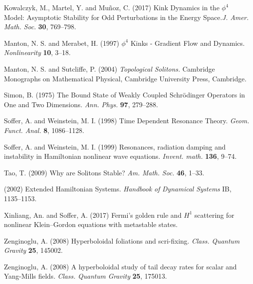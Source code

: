 \begin{thebibliography}{}

 Kowalczyk, M., Martel, Y. and Mu\~noz, C. (2017)
Kink Dynamics in the $\phi^4$ Model: Asymptotic Stability for Odd Perturbations in the Energy Space.\textit{J. Amer. Math. Soc.} {\bf 30}, 769--798.

 Manton, N. S. and Merabet, H. (1997)
$\phi^4$ Kinks - Gradient Flow and Dynamics. \textit{Nonlinearity} {\bf 10}, 3--18.

 Manton, N. S. and Sutcliffe, P. (2004)
\textit{Topological Solitons.} Cambridge Monographs on Mathematical Physical, Cambridge University Press, Cambridge.

 Simon, B. (1975)
The Bound State of Weakly Coupled Schr\"odinger Operators in One and Two Dimensions. \textit{Ann. Phys.} {\bf 97}, 279--288.


 Soffer, A. and Weinstein, M. I. (1998)
Time Dependent Resonance Theory. \textit{Geom. Funct. Anal.} {\bf 8}, 1086--1128.

 Soffer, A. and Weinstein, M. I. (1999)
Resonances, radiation damping and instability in Hamiltonian nonlinear wave equations. \textit{Invent. math.} {\bf 136}, 9--74.

 Tao, T. (2009)
Why are Solitons Stable? \textit{Am. Math. Soc.} {\bf 46}, 1--33.

 (2002)
Extended Hamiltonian Systems. \textit{Handbook of Dynamical Systems} IB, 1135--1153.

 Xinliang, An. and Soffer, A. (2017)
Fermi's golden rule and $H^1$ scattering for nonlinear Klein--Gordon equations with metastable states.

 Zenginoglu, A. (2008)
Hyperboloidal foliations and scri-fixing. \textit{Class. Quantum Gravity} {\bf 25}, 145002.

 Zenginoglu, A. (2008)
A hyperboloidal study of tail decay rates for scalar and Yang-Mills fields. \textit{Class. Quantum Gravity} {\bf 25}, 175013.





\end{thebibliography}